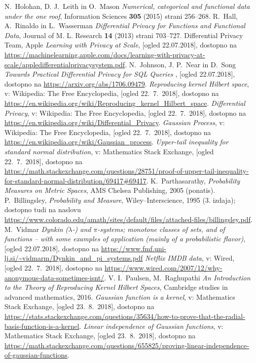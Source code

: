 \documentclass[12pt,a4paper]{amsart}
\theoremstyle{definition} %
\theoremstyle{plain} %
\begin{document}
\begin{thebibliography}{99}

N.~Holohan, D. J.~Leith in O.~Mason \emph{Numerical, categorical and functional data under the one roof}, Information Sciences \textbf{305} (2015) strani 256--268.
R.~Hall, A.~Rinaldo in L.~Wasserman \emph{Differential Privacy for Functions and Functional Data}, Journal of M. L. Research \textbf{14} (2013) strani 703--727.
Differential Privacy Team, Apple \emph{Learning with Privacy at Scale}, [ogled 22.07.2018], dostopno na \url{https://machinelearning.apple.com/docs/learning-with-privacy-at-scale/appledifferentialprivacysystem.pdf}.
N.~Johnson, J. P.~Near in D.~Song \emph{Towards Practical Differential Privacy for SQL Queries
}, [ogled 22.07.2018], dostopno na \url{https://arxiv.org/abs/1706.09479}.
\emph{Reproducing kernel Hilbert space}, v: Wikipedia: The Free Encyclopedia, [ogled 22.~7.~2018], dostopno na \url{https://en.wikipedia.org/wiki/Reproducing_kernel_Hilbert_space}.
\emph{Differential Privacy}, v: Wikipedia: The Free Encyclopedia, [ogled 22.~7.~2018], dostopno na \url{https://en.wikipedia.org/wiki/Differential_Privacy}.
\emph{Gaussian Process}, v: Wikipedia: The Free Encyclopedia, [ogled 22.~7.~2018], dostopno na \url{https://en.wikipedia.org/wiki/Gaussian_process}.
\emph{Upper-tail inequality for standard normal distribution}, v: Mathematics Stack Exchange, [ogled 22.~7.~2018], dostopno na \url{https://math.stackexchange.com/questions/28751/proof-of-upper-tail-inequality-for-standard-normal-distribution/69417#69417}.
K.~Parthasarathy, \emph{Probability Measures on Metric Spaces}, AMS Chelsea Publishing, 2005 (ponatis).
P.~Billingsley, \emph{Probability and Measure}, Wiley--Interscience, 1995 (3. izdaja); dostopno tudi na naslovu \url{https://www.colorado.edu/amath/sites/default/files/attached-files/billingsley.pdf}.
M.~Vidmar \emph{Dynkin ($\lambda$-) and $\pi$-systems; monotone classes of sets, and of
functions – with some examples of application (mainly of a
probabilistic flavor)}, [ogled 22.07.2018], dostopno na \url{https://www.fmf.uni-lj.si/~vidmarm/Dynkin_and_pi_systems.pdf} 
\emph{Netflix IMDB data}, v: Wired, [ogled 22.~7.~2018], dostopno na \url{https://www.wired.com/2007/12/why-anonymous-data-sometimes-isnt/}.
V. I.~Paulsen, M.~Raghupathi \emph{An Introduction to the Theory of Reproducing Kernel Hilbert Spaces}, Cambridge studies in advanced mathematics, 2016.
\emph{Gaussian function is a kernel}, v: Mathematics Stack Exchange, [ogled 23.~8.~2018], dostopno na \url{https://stats.stackexchange.com/questions/35634/how-to-prove-that-the-radial-basis-function-is-a-kernel}.
\emph{Linear independence of Gaussian functions}, v: Mathematics Stack Exchange, [ogled 23.~8.~2018], dostopno na \url{https://math.stackexchange.com/questions/655825/proving-linear-independence-of-gaussian-functions}.





\end{thebibliography}
\end{document}
